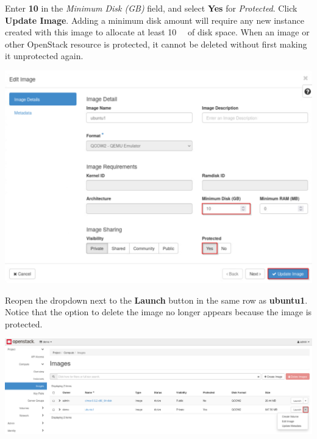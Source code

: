 \documentclass[letterpaper, 12pt]{article}
\begin{document}
\begin{enumerate}
    \begin{labstep}
        Enter \textbf{10} in the \textit{Minimum Disk (GB)} field, and select \textbf{Yes} for \textit{Protected}.
        Click \textbf{Update Image}.
        Adding a minimum disk amount will require any new instance created with this image to allocate at least \qty{10}{\giga\byte} of disk space.
        When an image or other OpenStack resource is protected, it cannot be deleted without first making it unprotected again.

        \begin{center}
            \includegraphics[width=\linewidth]{images/part1/step10.png}
        \end{center}
    \end{labstep}

    \begin{labstep}
        Reopen the dropdown next to the \textbf{Launch} button in the same row as \textbf{ubuntu1}.
        Notice that the option to delete the image no longer appears because the image is protected.

        \begin{center}
            \includegraphics[width=\linewidth]{images/part1/step11.png}
        \end{center}
    \end{labstep}


\end{enumerate}
\end{document}
